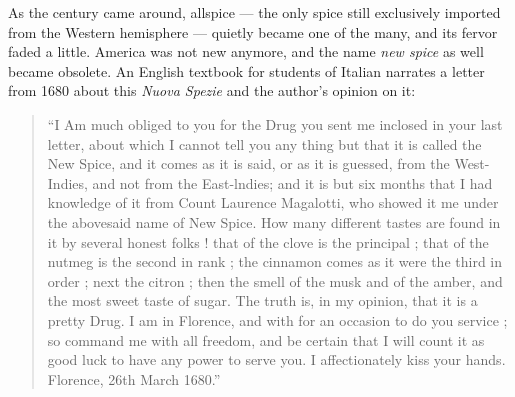 As the  century came around, allspice --- the only spice still exclusively imported from the Western hemisphere --- quietly became one of the many, and its fervor faded a little. America was not new anymore, and the name \textit{new spice} as well became obsolete. An English textbook for students of Italian narrates a letter from 1680 about this \textit{Nuova Spezie} and the author's opinion on it:

\begin{quote}
``I Am much obliged to you for the Drug you sent me inclosed in your last letter, about which I cannot tell you any thing but that it is called the New Spice, and it comes as it is said, or as it is guessed, from the West-Indies, and not from the East-lndies; and it is but six months that I had knowledge of it from Count Laurence Magalotti, who showed it me under the abovesaid name of New Spice. How many different tastes are found in it by several honest folks ! that of the clove is the principal ; that of the nutmeg is the second in rank ; the cinnamon comes as it were the third in order ; next the citron ; then the smell of the musk and of the amber, and the most sweet taste of sugar. The truth is, in my opinion, that it is a pretty Drug. I am in Florence, and with for an occasion to do you service ; so command me with all freedom, and be certain that I will count it as good luck to have any power to serve you. I affectionately kiss your hands. Florence, 26th March 1680.'' \autocite[5]{baretti_introduction_1755}
\end{quote}


